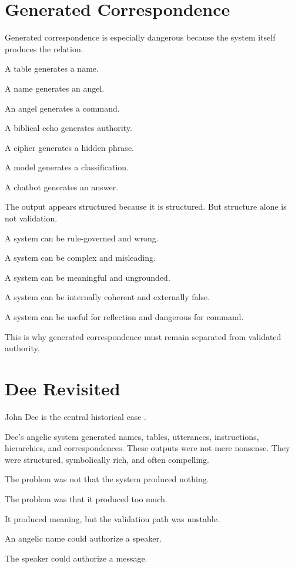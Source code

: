 \documentclass[11pt]{book}
\begin{document}
\section{Generated Correspondence}

Generated correspondence is especially dangerous because the system itself produces the relation.

A table generates a name.

A name generates an angel.

An angel generates a command.

A biblical echo generates authority.

A cipher generates a hidden phrase.

A model generates a classification.

A chatbot generates an answer.

The output appears structured because it is structured. But structure alone is not validation.

A system can be rule-governed and wrong.

A system can be complex and misleading.

A system can be meaningful and ungrounded.

A system can be internally coherent and externally false.

A system can be useful for reflection and dangerous for command.

This is why generated correspondence must remain separated from validated authority.

\section{Dee Revisited}

John Dee is the central historical case \cite{DeeCasaubon1659TrueFaithfulRelation,Yates1964GiordanoBruno}.

Dee's angelic system generated names, tables, utterances, instructions, hierarchies, and correspondences. These outputs were not mere nonsense. They were structured, symbolically rich, and often compelling.

The problem was not that the system produced nothing.

The problem was that it produced too much.

It produced meaning, but the validation path was unstable.

An angelic name could authorize a speaker.

The speaker could authorize a message.
\end{document}
